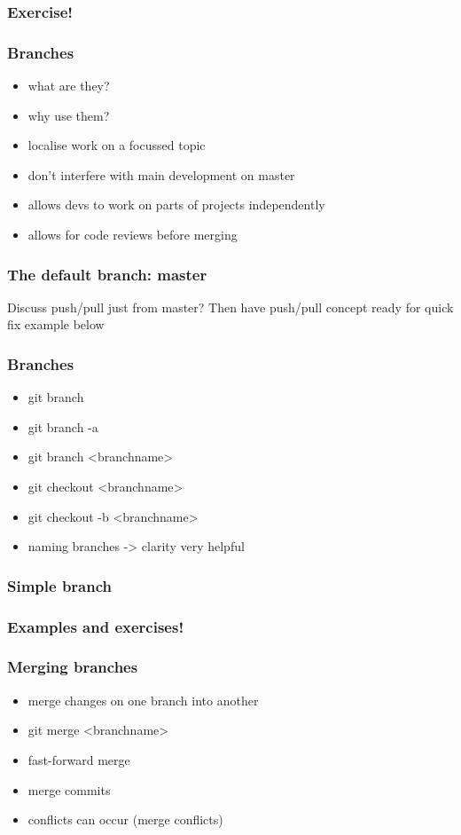 \documentclass{git_course}
\begin{document}
\begin{frame}
\frametitle{Exercise!}
\end{frame}

\begin{frame}
\frametitle{Branches}
\begin{itemize}
    \item what are they?
    \item why use them?
    \item localise work on a focussed topic
    \item don't interfere with main development on master
    \item allows devs to work on parts of projects independently
    \item allows for code reviews before merging
\end{itemize}
\end{frame}

\begin{frame}
\frametitle{The default branch: master}

Discuss push/pull just from master?  Then have push/pull concept ready
for quick fix example below
\end{frame}

\begin{frame}
\frametitle{Branches}
\begin{itemize}
    \item git branch
    \item git branch -a
    \item git branch <branchname>
    \item git checkout <branchname>
    \item git checkout -b <branchname>
    \item naming branches -> clarity very helpful
\end{itemize}
\end{frame}

\begin{frame}
\frametitle{Simple branch}
\begin{center}
    \resizebox{!}{0.7\textheight}{
        
    }
\end{center}
\end{frame}

\begin{frame}
\frametitle{Examples and exercises!}
\end{frame}

\begin{frame}
\frametitle{Merging branches}
\begin{itemize}
    \item merge changes on one branch into another
    \item git merge <branchname>
    \item fast-forward merge
    \item merge commits
    \item conflicts can occur (merge conflicts)
\end{itemize}
\end{frame}
\end{document}
